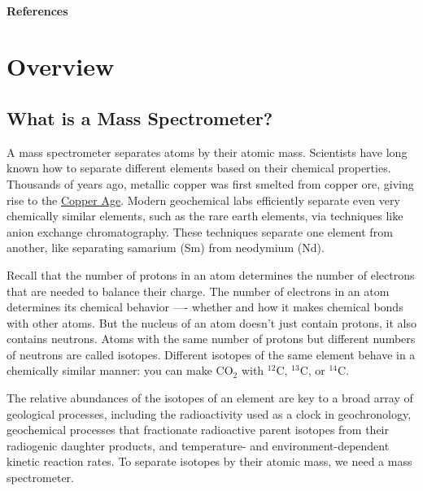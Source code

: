 \documentclass[
  letterpaper,
  DIV=11,
  numbers=noendperiod]{scrreprt}
\newlength{\cslhangindent}
\newenvironment{CSLReferences}[2] %
 {\begin{list}{}{%
  \setlength{\itemindent}{0pt}
  \setlength{\leftmargin}{0pt}
  \setlength{\parsep}{0pt}
  \ifodd #1
   \setlength{\leftmargin}{\cslhangindent}
   \setlength{\itemindent}{-1\cslhangindent}
  \fi
  \setlength{\itemsep}{#2\baselineskip}}}
 {\end{list}}
\begin{document}
\subsubsection{References}\label{references}

\label{refs}
\begin{CSLReferences}{0}{1}
\end{CSLReferences}


\chapter{Overview}\label{overview}

\section{What is a Mass
Spectrometer?}\label{what-is-a-mass-spectrometer}

A mass spectrometer separates atoms by their atomic mass. Scientists
have long known how to separate different elements based on their
chemical properties. Thousands of years ago, metallic copper was first
smelted from copper ore, giving rise to the
\href{https://en.wikipedia.org/wiki/Chalcolithic}{Copper Age}. Modern
geochemical labs efficiently separate even very chemically similar
elements, such as the rare earth elements, via techniques like anion
exchange chromatography. These techniques separate one element from
another, like separating samarium (Sm) from neodymium (Nd).

Recall that the number of protons in an atom determines the number of
electrons that are needed to balance their charge. The number of
electrons in an atom determines its chemical behavior ---- whether and
how it makes chemical bonds with other atoms. But the nucleus of an atom
doesn't just contain protons, it also contains neutrons. Atoms with the
same number of protons but different numbers of neutrons are called
isotopes. Different isotopes of the same element behave in a chemically
similar manner: you can make CO\(_{2}\) with \(^{12}\)C, \(^{13}\)C, or
\(^{14}\)C.

The relative abundances of the isotopes of an element are key to a broad
array of geological processes, including the radioactivity used as a
clock in geochronology, geochemical processes that fractionate
radioactive parent isotopes from their radiogenic daughter products, and
temperature- and environment-dependent kinetic reaction rates. To
separate isotopes by their atomic mass, we need a mass spectrometer.
\end{document}
